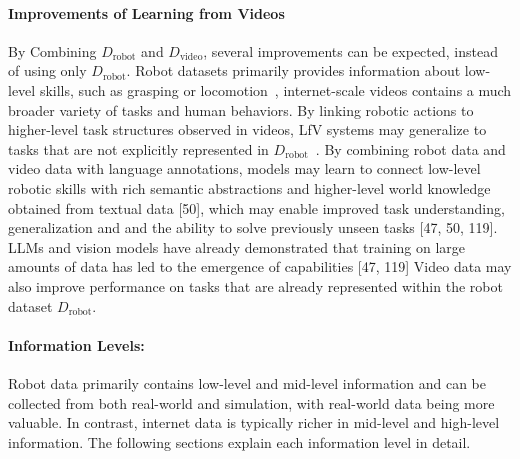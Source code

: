 \paragraph{Improvements of Learning from Videos} 
By Combining $D_{\text{robot}}$ and $D_{\text{video}}$, several improvements can be expected, instead of using only $D_{\text{robot}}$. Robot datasets primarily provides information about low-level skills, such as grasping or locomotion~\cite{Chen2024RH20TPAP}, internet-scale videos contains a much broader variety of tasks and human behaviors. By linking robotic actions to higher-level task structures observed in videos, \ac{LfV} systems may generalize to tasks that are not explicitly represented in $D_{\text{robot}}$~\cite{Eze2024LearningBW, Brohan2023RT2VM, Du2023LearningUP, Wu2023UnleashingLV, Wang2023MimicPlayLI}.
By combining robot data and video data with language annotations, models may learn to connect low-level robotic skills with rich semantic abstractions and higher-level world knowledge obtained from textual data [50], which may enable improved task understanding, generalization and and the ability to solve previously unseen tasks [47, 50, 119]. LLMs and vision models have already demonstrated that training on large amounts of data has led to the emergence of capabilities [47, 119]
Video data may also improve performance on tasks that are already represented within the robot dataset $D_{\text{robot}}$. 











\paragraph{Information Levels:}
Robot data primarily contains low-level and mid-level information and can be collected from both real-world and simulation, with real-world data being more valuable. In contrast, internet data is typically richer in mid-level and high-level information. The following sections explain each information level in detail.

